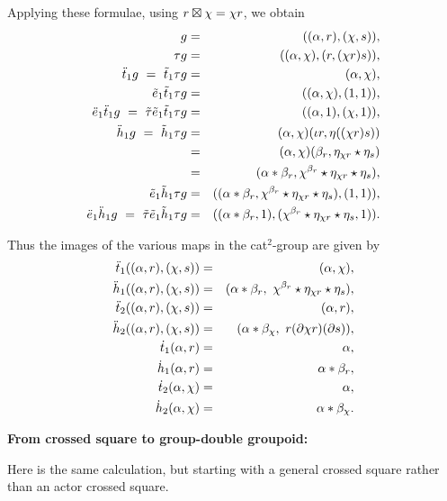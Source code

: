 \noindent
Applying these formulae, using $r \boxtimes \chi = \chi r$, we obtain
\begin{eqnarray*}
g 
    &=& ((\alpha,r),(\chi,s)), \\
\tau g 
    &=& ((\alpha,\chi),(r,(\chi r)s)), \\
\ddot{t}_1 g ~=~ 
  \tilde{t}_1 \tau g 
    &=& (\alpha,\chi), \\
\tilde{e}_1 \tilde{t}_1 \tau g 
    &=& ((\alpha,\chi),(1,1)), \\
\ddot{e}_1\ddot{t}_1 g ~=~
  \tilde{\tau} \tilde{e}_1 \tilde{t}_1 \tau g 
    &=& ((\alpha,1),(\chi,1)), \\
\ddot{h}_1 g ~=~ 
  \tilde{h}_1 \tau g 
    &=& (\alpha,\chi)(\iota r, \eta((\chi r)s))  \\
    &=& (\alpha,\chi)(\beta_r, \eta_{\chi r} \star \eta_s) \\
    &=& (\alpha * \beta_r, \chi^{\beta_r} \star \eta_{\chi r} \star \eta_s),\\
\tilde{e}_1 \tilde{h}_1 \tau g 
    &=& ((\alpha*\beta_r,\chi^{\beta_r}\star\eta_{\chi r}\star\eta_s),(1,1)),\\
\ddot{e}_1\ddot{h}_1 g ~=~ 
\tilde{\tau} \tilde{e}_1 \tilde{h}_1 \tau g 
    &=& ((\alpha*\beta_r,1),(\chi^{\beta_r}\star\eta_{\chi r}\star\eta_s,1)).\\
\end{eqnarray*}

\noindent
Thus the images of the various maps in the cat$^2$-group are given by
\begin{eqnarray*}
\ddot{t}_1((\alpha,r),(\chi,s)) 
 & = &  (\alpha,\chi), \\
\ddot{h}_1((\alpha,r),(\chi,s)) 
 & = &  (\alpha * \beta_r,~ \chi^{\beta_r}\star\eta_{\chi r}\star\eta_s), \\
\ddot{t}_2((\alpha,r),(\chi,s)) 
 & = &  (\alpha,r), \\
\ddot{h}_2((\alpha,r),(\chi,s)) 
 & = &  (\alpha * \beta_{\chi},~ r(\partial\chi r)(\partial s)), \\
\dot{t}_1(\alpha,r)
 & = &  \alpha, \\
\dot{h}_1(\alpha,r)
 & = &  \alpha * \beta_r, \\
\dot{t}_2(\alpha,\chi) 
 & = &  \alpha, \\ 
\dot{h}_2(\alpha,\chi) 
 & = &  \alpha * \beta_{\chi}. 
\end{eqnarray*}

\medskip\noindent
{\bf From crossed square to group-double groupoid:}

Here is the same calculation, but starting with a general crossed square 
rather than an actor crossed square.

